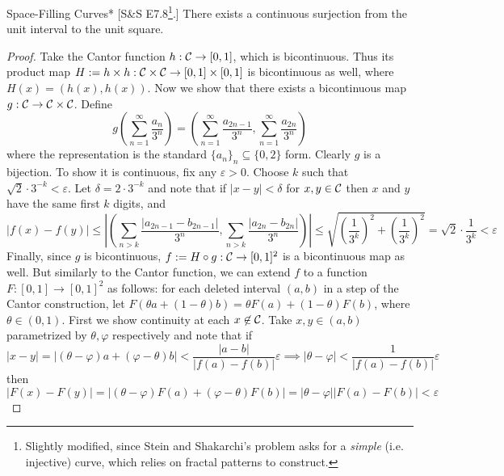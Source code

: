 \begin{problem}{Space-Filling Curves}*
    [S\&S E7.8\footnote{Slightly modified, since Stein and Shakarchi's problem asks for a \textit{simple} (i.e. injective) curve, which relies on fractal patterns to construct.}.] There exists a continuous surjection from the unit interval to the unit square.
\end{problem}

\begin{proof}
    Take the Cantor function \(h : \mathcal{C} \to [0, 1]\), which is bicontinuous. Thus its product map \(H := h \times h : \mathcal{C} \times \mathcal{C} \to [0,1] \times [0,1]\) is bicontinuous as well, where \(H(x) = (h(x), h(x))\). Now we show that there exists a bicontinuous map \(g : \mathcal{C} \to \mathcal{C} \times \mathcal{C}\). Define
    \[
        g \left( \sum_{n=1}^\infty \frac{a_n}{3^n} \right) 
        = \left( \sum_{n=1}^\infty \frac{a_{2n-1}}{3^n}, \sum_{n=1}^\infty \frac{a_{2n}}{3^n} \right)
    \]
    where the representation is the standard \(\{a_n\}_n \subseteq \{0, 2\}\) form. Clearly \(g\) is a bijection. To show it is continuous, fix any \(\varepsilon > 0\). Choose \(k\) such that \(\sqrt{2} \cdot 3^{-k} < \varepsilon\). Let \(\delta = 2 \cdot 3^{-k}\) and note that if \(|x - y| < \delta\) for \(x,y \in \mathcal{C}\) then \(x\) and \(y\) have the same first \(k\) digits, and 
    \[
        |f(x) - f(y)|
        \leq \left| \left( \sum_{n > k} \frac{|a_{2n-1} - b_{2n-1}|}{3^n}, \sum_{n > k} \frac{|a_{2n} - b_{2n}|}{3^n} \right) \right| 
        \leq \sqrt{\left(\frac{1}{3^k}\right)^2 + \left(\frac{1}{3^k} \right)^2}
        = \sqrt{2} \cdot \frac{1}{3^k} 
        < \varepsilon
    \]
    Finally, since \(g\) is bicontinuous, \(f := H \circ g : \mathcal{C} \to [0, 1]^2\) is a bicontinuous map as well. But similarly to the Cantor function, we can extend \(f\) to a function \(F : [0, 1] \to [0, 1]^2\) as follows: for each deleted interval \((a, b)\) in a step of the Cantor construction, let \(F(\theta a + (1 - \theta)b) = \theta F(a) + (1 - \theta) F(b)\), where \(\theta \in (0, 1)\). First we show continuity at each \(x \not\in \mathcal{C}\). Take \(x, y \in (a, b)\) parametrized by \(\theta, \varphi\) respectively and note that if
    \[
        |x - y| = |(\theta - \varphi)a + (\varphi - \theta)b| 
        < \frac{|a - b|}{|f(a) - f(b)|} \varepsilon
        \implies |\theta - \varphi| < \frac{1}{|f(a) - f(b)|} \varepsilon
    \]
    then 
    \[
        |F(x) - F(y)|
        = |(\theta - \varphi) F(a) + (\varphi - \theta) F(b)|
        = |\theta - \varphi| |F(a) - F(b)|
        < \varepsilon
    \]

\end{proof}
